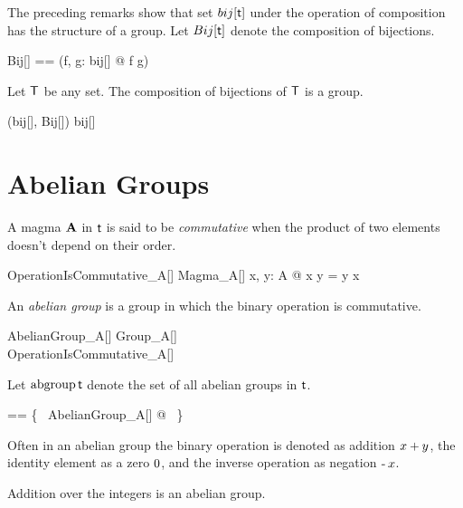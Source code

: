 \documentclass{amsart}
\begin{document}
The preceding remarks show that set $bij[\mathsf{t}]$ under the operation of composition has the structure of a group.
Let $Bij[\mathsf{t}]$ denote the composition of bijections.
\begin{zed}
	Bij[\genT] == (\lambda f, g: bij[\genT] @ f \circ g)
\end{zed}

\begin{example}
Let $\mathsf{T}$ be any set.
The composition of bijections of $\mathsf{T}$ is a group.

\begin{zed}
(bij[\setT], Bij[\setT]) \in \group bij[\setT]
\end{zed}

\end{example}

\section{Abelian Groups}

A magma $\mathbf{A}$ in $\mathsf{t}$ is said to be {\em commutative} when the product of two elements doesn't depend on 
their order.
\begin{schema}{OperationIsCommutative\_A}[\genT]
	Magma\_A[\genT]
\where
	\forall x, y: A @ x \mulA y = y \mulA x
\end{schema}

An {\em abelian group} is a group in which the binary operation is commutative.
\begin{schema}{AbelianGroup\_A}[\genT]
	Group\_A[\genT] \\
	OperationIsCommutative\_A[\genT]
\end{schema}

Let $\operatorname{abgroup} \mathsf{t}$ denote the set of all abelian groups in $\mathsf{t}$.
\begin{zed}
	\abgroup \genT == \{~ AbelianGroup\_A[\genT] @ \strucA ~\}
\end{zed}

Often in an abelian group the binary operation is denoted as addition $x \mathbin{+} y$,
the identity element as a zero $0$, and the inverse operation as negation $\operatorname{-} x$.

\begin{example}
Addition over the integers is an abelian group.

\begin{zed}
	(\num, (\_ + \_)) \in \abgroup \num
\end{zed}

\end{example}

\printbibliography
\end{document}
